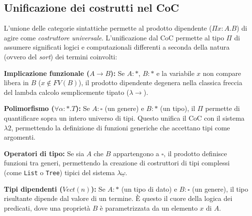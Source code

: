 \subsection{Unificazione dei costrutti nel CoC}
L'unione delle categorie sintattiche permette al prodotto dipendente ($\Pi x : A. B$) di agire come \emph{costruttore universale}. L'unificazione dal CoC permette 
al tipo $\Pi$ di assumere significati logici e computazionali differenti a seconda della natura (ovvero del \textit{sort}) dei termini coinvolti:
\begin{description}
    \item \textbf{Implicazione funzionale ($A \to B$):}
        Se $A : \ast$, $B : \ast$ e la variabile $x$ non compare libera in $B$ ($x \notin FV(B)$), 
        il prodotto dipendente degenera nella classica freccia del lambda calcolo semplicemente tipato ($\lambda{\to}$).
    \item \textbf{Polimorfismo ($\forall \alpha : \ast . T$):} 
        Se $A : \square$ (un genere) e $B : \ast$ (un tipo), il $\Pi$ permette di quantificare sopra un intero universo di tipi. 
        Questo unifica il CoC con il sistema $\lambda2$, permettendo la definizione di funzioni generiche che accettano tipi come argomenti.
    \item \textbf{Operatori di tipo:}
        Se sia $A$ che $B$ appartengono a $\square$, il prodotto definisce funzioni tra generi, 
        permettendo la creazione di costruttori di tipi complessi (come \texttt{List} o \texttt{Tree}) 
        tipici del sistema $\lambda\underline{\omega}$.
    \item \textbf{Tipi dipendenti ($Vect(n)$):}
        Se $A : \ast$ (un tipo di dato) e $B : \square$ (un genere), il tipo risultante dipende dal valore di un termine. 
        È questo il cuore della logica dei predicati, dove una proprietà $B$ è parametrizzata da un elemento $x$ di $A$.
\end{description}

